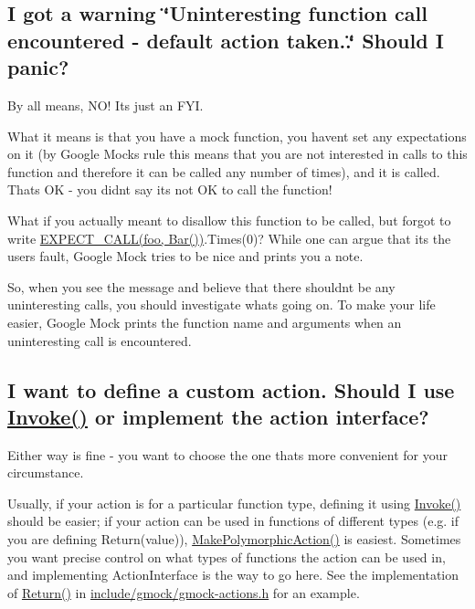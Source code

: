 \subsection*{I got a warning \char`\"{}\+Uninteresting function call encountered -\/ default action taken..\char`\"{} Should I panic?}

By all means, N\+O! It\textquotesingle{}s just an F\+YI.

What it means is that you have a mock function, you haven\textquotesingle{}t set any expectations on it (by Google Mock\textquotesingle{}s rule this means that you are not interested in calls to this function and therefore it can be called any number of times), and it is called. That\textquotesingle{}s OK -\/ you didn\textquotesingle{}t say it\textquotesingle{}s not OK to call the function!

What if you actually meant to disallow this function to be called, but forgot to write {\ttfamily \hyperlink{gmock-spec-builders_8h_a535a6156de72c1a2e25a127e38ee5232}{E\+X\+P\+E\+C\+T\+\_\+\+C\+A\+L\+L(foo, Bar())}.Times(0)}? While one can argue that it\textquotesingle{}s the user\textquotesingle{}s fault, Google Mock tries to be nice and prints you a note.

So, when you see the message and believe that there shouldn\textquotesingle{}t be any uninteresting calls, you should investigate what\textquotesingle{}s going on. To make your life easier, Google Mock prints the function name and arguments when an uninteresting call is encountered.

\subsection*{I want to define a custom action. Should I use \hyperlink{namespacetesting_a12aebaf8363d49a383047529f798b694}{Invoke()} or implement the action interface?}

Either way is fine -\/ you want to choose the one that\textquotesingle{}s more convenient for your circumstance.

Usually, if your action is for a particular function type, defining it using {\ttfamily \hyperlink{namespacetesting_a12aebaf8363d49a383047529f798b694}{Invoke()}} should be easier; if your action can be used in functions of different types (e.\+g. if you are defining {\ttfamily Return(value)}), {\ttfamily \hyperlink{namespacetesting_a36bd06c5ea972c6df0bd9f40a7a94c65}{Make\+Polymorphic\+Action()}} is easiest. Sometimes you want precise control on what types of functions the action can be used in, and implementing {\ttfamily Action\+Interface} is the way to go here. See the implementation of {\ttfamily \hyperlink{namespacetesting_af6d1c13e9376c77671e37545cd84359c}{Return()}} in {\ttfamily \hyperlink{gmock-actions_8h}{include/gmock/gmock-\/actions.\+h}} for an example.

